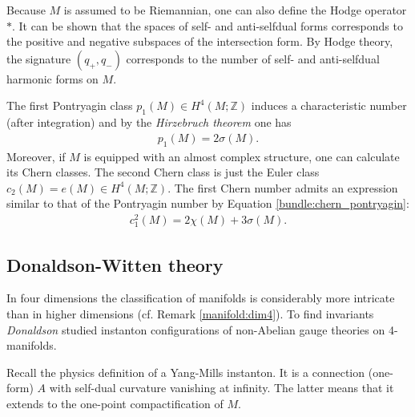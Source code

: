     Because $M$ is assumed to be Riemannian, one can also define the Hodge operator $\ast$. It can be shown that the spaces of self- and anti-selfdual forms corresponds to the positive and negative subspaces of the intersection form. By Hodge theory, the signature $(q_+,q_-)$ corresponds to the number of self- and anti-selfdual harmonic forms on $M$.

    The first Pontryagin class $p_1(M)\in H^4(M;\mathbb{Z})$ induces a characteristic number (after integration) and by the \textit{Hirzebruch theorem} one has
    \begin{gather}
        p_1(M) = 2\sigma(M).
    \end{gather}
    Moreover, if $M$ is equipped with an almost complex structure, one can calculate its Chern classes. The second Chern class is just the Euler class $c_2(M)=e(M)\in H^4(M;\mathbb{Z})$. The first Chern number admits an expression similar to that of the Pontryagin number by Equation \eqref{bundle:chern_pontryagin}:
    \begin{gather}
        c^2_1(M) = 2\chi(M) + 3\sigma(M).
    \end{gather}

\subsection{Donaldson-Witten theory}

    In four dimensions the classification of manifolds is considerably more intricate than in higher dimensions (cf. Remark \ref{manifold:dim4}). To find invariants \textit{Donaldson} studied instanton configurations of non-Abelian gauge theories on 4-manifolds.

    Recall the physics definition of a Yang-Mills instanton. It is a connection (one-form) $A$ with self-dual curvature vanishing at infinity. The latter means that it extends to the one-point compactification of $M$.

